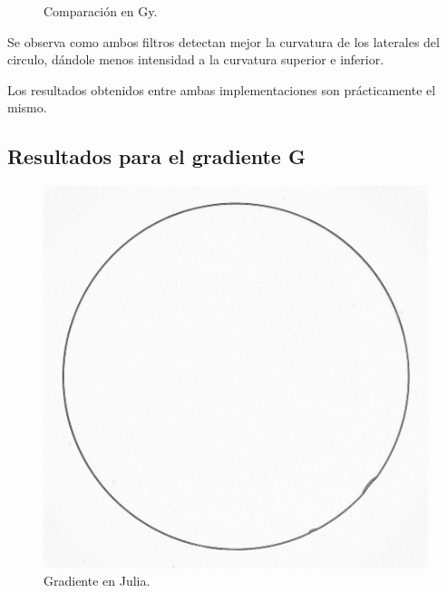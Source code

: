 \documentclass[11pt, letterpaper]{article}
\begin{document}
\begin{figure}[h]
	\caption{Comparación en Gy.}
	\label{fig:comparacion en gy}
\end{figure}		

Se observa como ambos filtros detectan mejor la curvatura de los laterales del circulo, dándole menos intensidad a la curvatura superior e inferior.

Los resultados obtenidos entre ambas implementaciones son prácticamente el mismo.

\newpage

\subsection{Resultados para el gradiente G}

\begin{figure}[h]
	
	\begin{minipage}{0.48\textwidth} %
		\centering
		\includegraphics[width=\textwidth]{IMG/q31.png} %
		\caption{Gradiente en Julia.}
		\label{fig:img6}
	\end{minipage}\hfill %
	\begin{minipage}{0.48\textwidth} %

\end{minipage}
\end{figure}
\end{document}
